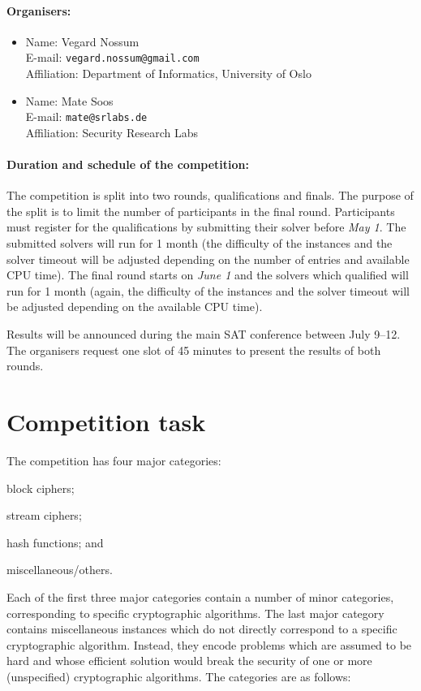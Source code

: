 \documentclass[12pt, a4paper]{article}
\begin{document}
\paragraph{Organisers:}
\begin{itemize}
\item Name: Vegard Nossum \\ E-mail: \texttt{vegard.nossum@gmail.com} \\ Affiliation: Department of Informatics, University of Oslo
\item Name: Mate Soos \\ E-mail: \texttt{mate@srlabs.de} \\ Affiliation: Security Research Labs
\end{itemize}

\paragraph{Duration and schedule of the competition:} The competition is split into two rounds, qualifications and finals. The purpose of the split is to limit the number of participants in the final round. Participants must register for the qualifications by submitting their solver before \emph{May 1}. The submitted solvers will run for 1 month (the difficulty of the instances and the solver timeout will be adjusted depending on the number of entries and available CPU time). The final round starts on \emph{June 1} and the solvers which qualified will run for 1 month (again, the difficulty of the instances and the solver timeout will be adjusted depending on the available CPU time).

Results will be announced during the main SAT conference between July 9--12. The organisers request one slot of 45 minutes to present the results of both rounds.

\section{Competition task}

The competition has four major categories:
\begin{inparaenum}[(1)]
\item block ciphers;
\item stream ciphers;
\item hash functions; and
\item miscellaneous/others.
\end{inparaenum}
Each of the first three major categories contain a number of minor categories, corresponding to specific cryptographic algorithms. The last major category contains miscellaneous instances which do not directly correspond to a specific cryptographic algorithm. Instead, they encode problems which are assumed to be hard and whose efficient solution would break the security of one or more (unspecified) cryptographic algorithms. The categories are as follows:
\end{document}
